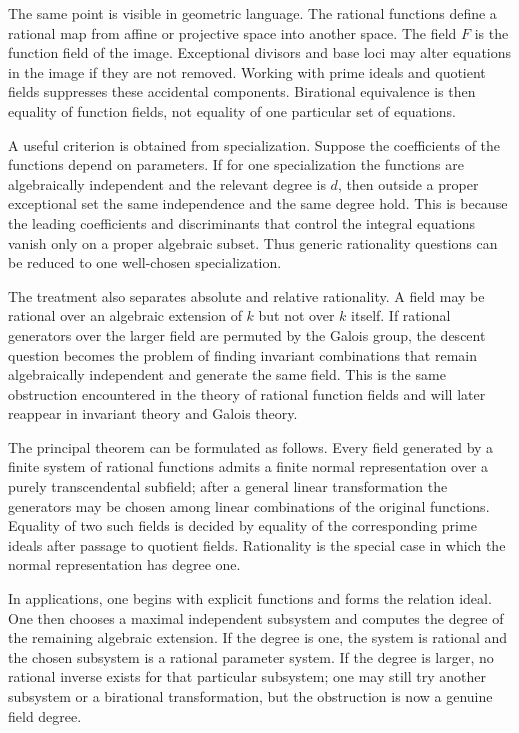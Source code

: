 \documentclass[11pt]{article}
\begin{document}
The same point is visible in geometric language. The rational functions define a rational map from
affine or projective space into another space. The field \(F\) is the function field of the image.
Exceptional divisors and base loci may alter equations in the image if they are not removed. Working
with prime ideals and quotient fields suppresses these accidental components. Birational equivalence
is then equality of function fields, not equality of one particular set of equations.


A useful criterion is obtained from specialization. Suppose the coefficients of the functions depend
on parameters. If for one specialization the functions are algebraically independent and the
relevant degree is \(d\), then outside a proper exceptional set the same independence and the same
degree hold. This is because the leading coefficients and discriminants that control the integral
equations vanish only on a proper algebraic subset. Thus generic rationality questions can be
reduced to one well-chosen specialization.


The treatment also separates absolute and relative rationality. A field may be rational over an
algebraic extension of \(k\) but not over \(k\) itself. If rational generators over the larger field
are permuted by the Galois group, the descent question becomes the problem of finding invariant
combinations that remain algebraically independent and generate the same field. This is the same
obstruction encountered in the theory of rational function fields and will later reappear in
invariant theory and Galois theory.


The principal theorem can be formulated as follows. Every field generated by a finite system of
rational functions admits a finite normal representation over a purely transcendental subfield;
after a general linear transformation the generators may be chosen among linear combinations of the
original functions. Equality of two such fields is decided by equality of the corresponding prime
ideals after passage to quotient fields. Rationality is the special case in which the normal
representation has degree one.


In applications, one begins with explicit functions and forms the relation ideal. One then chooses a
maximal independent subsystem and computes the degree of the remaining algebraic extension. If the
degree is one, the system is rational and the chosen subsystem is a rational parameter system. If
the degree is larger, no rational inverse exists for that particular subsystem; one may still try
another subsystem or a birational transformation, but the obstruction is now a genuine field degree.
\end{document}
